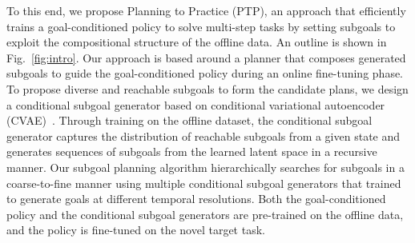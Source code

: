 To this end, we propose Planning to Practice (PTP), an approach that efficiently trains a goal-conditioned policy to solve
multi-step tasks by setting subgoals to exploit the compositional structure of the offline data.
An outline is shown in Fig.~\ref{fig:intro}. Our approach is based around a planner that composes generated subgoals
to guide the goal-conditioned policy during an online fine-tuning phase.
To propose diverse and reachable subgoals to form the candidate plans, we design a conditional subgoal generator based on conditional variational autoencoder (CVAE)~\cite{sohn2015cvae}.
Through training on the offline dataset, the conditional subgoal generator captures the distribution of reachable subgoals from a given state and generates sequences of subgoals from the learned latent space in a recursive manner.
Our subgoal planning algorithm hierarchically searches for subgoals in a coarse-to-fine manner using multiple conditional subgoal generators that trained to generate goals at different temporal resolutions.
Both the goal-conditioned policy and the conditional subgoal generators are pre-trained on the offline data, and the policy is fine-tuned on the novel target task. 

